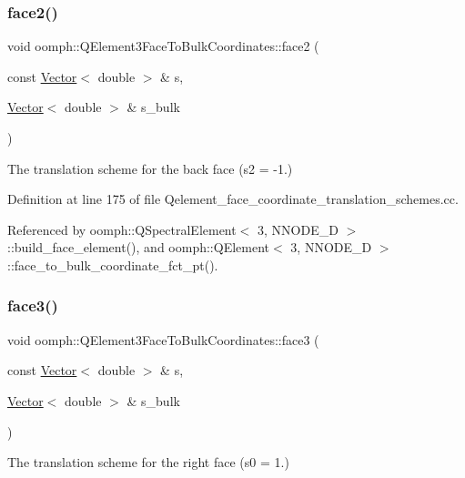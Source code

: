 \subsubsection{\texorpdfstring{face2()}{face2()}}
{\footnotesize\ttfamily void oomph\+::\+Q\+Element3\+Face\+To\+Bulk\+Coordinates\+::face2 (\begin{DoxyParamCaption}\item[{const \hyperlink{classoomph_1_1Vector}{Vector}$<$ double $>$ \&}]{s,  }\item[{\hyperlink{classoomph_1_1Vector}{Vector}$<$ double $>$ \&}]{s\+\_\+bulk }\end{DoxyParamCaption})}



The translation scheme for the back face (s2 = -\/1.) 



Definition at line 175 of file Qelement\+\_\+face\+\_\+coordinate\+\_\+translation\+\_\+schemes.\+cc.



Referenced by oomph\+::\+Q\+Spectral\+Element$<$ 3, N\+N\+O\+D\+E\+\_\+D $>$\+::build\+\_\+face\+\_\+element(), and oomph\+::\+Q\+Element$<$ 3, N\+N\+O\+D\+E\+\_\+D $>$\+::face\+\_\+to\+\_\+bulk\+\_\+coordinate\+\_\+fct\+\_\+pt().

\mbox{\label{namespaceoomph_1_1QElement3FaceToBulkCoordinates_a98113be325f672274d18cb10d5de2389}} 
\subsubsection{\texorpdfstring{face3()}{face3()}}
{\footnotesize\ttfamily void oomph\+::\+Q\+Element3\+Face\+To\+Bulk\+Coordinates\+::face3 (\begin{DoxyParamCaption}\item[{const \hyperlink{classoomph_1_1Vector}{Vector}$<$ double $>$ \&}]{s,  }\item[{\hyperlink{classoomph_1_1Vector}{Vector}$<$ double $>$ \&}]{s\+\_\+bulk }\end{DoxyParamCaption})}



The translation scheme for the right face (s0 = 1.) 



